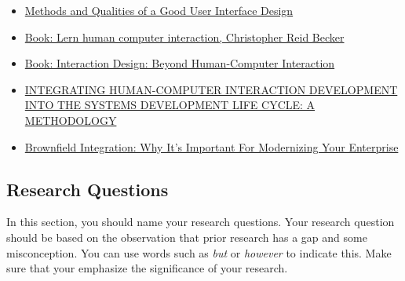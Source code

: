 \begin{itemize}
	\item \href{https://www.diva-portal.org/smash/get/diva2:215020/FULLTEXT01.pdf }{Methods and Qualities of a Good User Interface Design}
	\item \href{}{Book: Lern human computer interaction, Christopher Reid Becker}
	\item \href{}{Book: Interaction Design: Beyond Human-Computer Interaction }
	\item \href{https://citeseerx.ist.psu.edu/viewdoc/download?doi=10.1.1.75.2615&rep=rep1&type=pdf}{INTEGRATING HUMAN-COMPUTER INTERACTION DEVELOPMENT INTO THE SYSTEMS DEVELOPMENT LIFE CYCLE: A METHODOLOGY}
	\item \href{https://wso2.com/library/articles/2019/04/brownfield-integration-why-its-important-for-modernizing-your-enterprise/}{Brownfield Integration: Why It's Important For Modernizing Your Enterprise}
\end{itemize}

\subsection{Research Questions}
\label{subsec:question}
In this section, you should name your research questions. Your research question should be based on the observation that prior research has a gap and some misconception. You can use words such as \emph{but} or \emph{however} to indicate this. Make sure that your emphasize the significance of your research. 